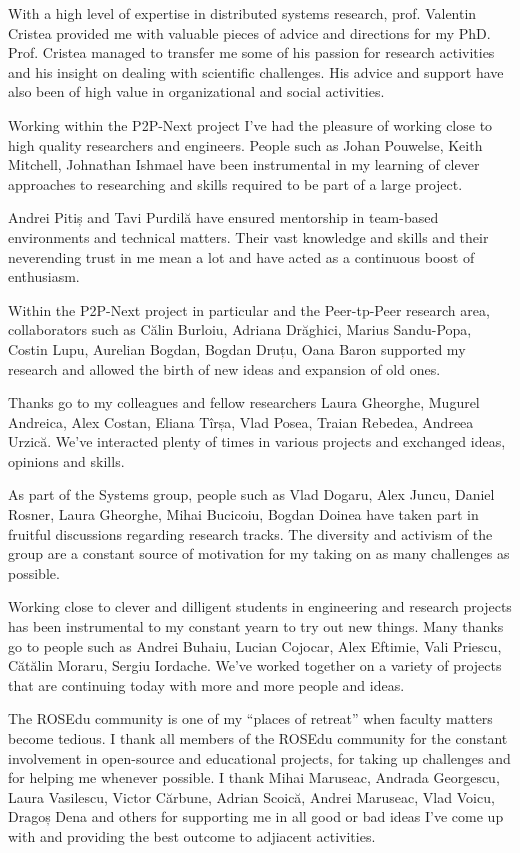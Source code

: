 With a high level of expertise in distributed systems research, prof. Valentin
Cristea provided me with valuable pieces of advice and directions for my PhD.
Prof. Cristea managed to transfer me some of his passion for research
activities and his insight on dealing with scientific challenges. His advice
and support have also been of high value in organizational and social
activities.

Working within the P2P-Next project I've had the pleasure of working close to
high quality researchers and engineers. People such as Johan Pouwelse, Keith
Mitchell, Johnathan Ishmael have been instrumental in my learning of clever
approaches to researching and skills required to be part of a large project.

Andrei Pitiș and Tavi Purdilă have ensured mentorship in team-based
environments and technical matters. Their vast knowledge and skills and their
neverending trust in me mean a lot and have acted as a continuous boost of
enthusiasm.

Within the P2P-Next project in particular and the Peer-tp-Peer research area,
collaborators such as Călin Burloiu, Adriana Drăghici, Marius Sandu-Popa,
Costin Lupu, Aurelian Bogdan, Bogdan Druțu, Oana Baron supported my research
and allowed the birth of new ideas and expansion of old ones.

Thanks go to my colleagues and fellow researchers Laura Gheorghe, Mugurel
Andreica, Alex Costan, Eliana Tîrșa, Vlad Posea, Traian Rebedea, Andreea
Urzică. We've interacted plenty of times in various projects and exchanged
ideas, opinions and skills.

As part of the Systems group, people such as Vlad Dogaru, Alex Juncu, Daniel
Rosner, Laura Gheorghe, Mihai Bucicoiu, Bogdan Doinea have taken part in
fruitful discussions regarding research tracks. The diversity and activism of
the group are a constant source of motivation for my taking on as many
challenges as possible.

Working close to clever and dilligent students in engineering and research
projects has been instrumental to my constant yearn to try out new things.
Many thanks go to people such as Andrei Buhaiu, Lucian Cojocar, Alex Eftimie,
Vali Priescu, Cătălin Moraru, Sergiu Iordache. We've worked together on a
variety of projects that are continuing today with more and more people and
ideas.

The ROSEdu community is one of my ``places of retreat'' when faculty matters
become tedious. I thank all members of the ROSEdu community for the constant
involvement in open-source and educational projects, for taking up challenges
and for helping me whenever possible. I thank Mihai Maruseac, Andrada
Georgescu, Laura Vasilescu, Victor Cărbune, Adrian Scoică, Andrei Maruseac,
Vlad Voicu, Dragoș Dena and others for supporting me in all good or bad ideas
I've come up with and providing the best outcome to adjiacent activities.

